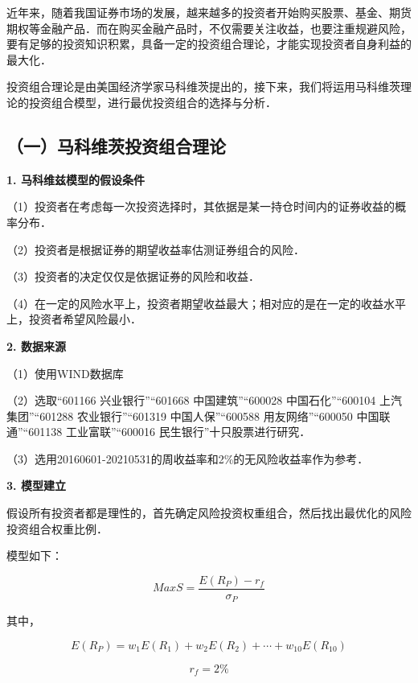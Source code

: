 

近年来，随着我国证券市场的发展，越来越多的投资者开始购买股票、基金、期货期权等金融产品．而在购买金融产品时，不仅需要关注收益，也要注重规避风险，要有足够的投资知识积累，具备一定的投资组合理论，才能实现投资者自身利益的最大化．

投资组合理论是由美国经济学家马科维茨提出的，接下来，我们将运用马科维茨理论的投资组合模型，进行最优投资组合的选择与分析．

\subsection{（一）马科维茨投资组合理论}

\textbf{1. 马科维兹模型的假设条件}

（1）投资者在考虑每一次投资选择时，其依据是某一持仓时间内的证券收益的概率分布．

（2）投资者是根据证券的期望收益率估测证券组合的风险．

（3）投资者的决定仅仅是依据证券的风险和收益．

（4）在一定的风险水平上，投资者期望收益最大；相对应的是在一定的收益水平上，投资者希望风险最小．

\textbf{2.	数据来源}

（1）使用WIND数据库

（2）选取“601166 兴业银行”“601668 中国建筑”“600028 中国石化”“600104 上汽集团”“601288 农业银行”“601319 中国人保”“600588 用友网络”“600050 中国联通”“601138 工业富联”“600016 民生银行”十只股票进行研究．

（3）选用20160601-20210531的周收益率和2\%的无风险收益率作为参考．

\textbf{3.	模型建立}

假设所有投资者都是理性的，首先确定风险投资权重组合，然后找出最优化的风险投资组合权重比例．

模型如下：

\begin{equation}
Max S=\frac {E(R_P)-r_f}{\sigma_P}
\end{equation}

其中，

\begin{equation}
E(R_P)=w_1E(R_1)+w_2E(R_2)+\cdots+w_{10}E(R_{10})
\end{equation}

\begin{equation}
r_f=2\%
\end{equation}

